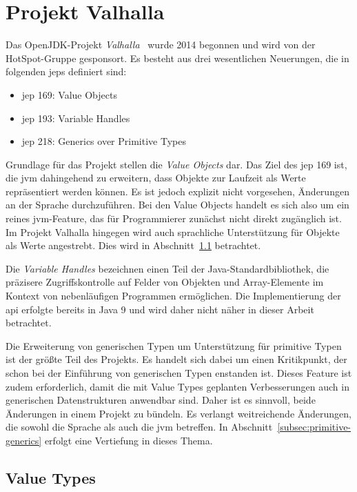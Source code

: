 \section{Projekt Valhalla}\label{sec:valhalla}

Das OpenJDK-Projekt \emph{Valhalla}~\cite{openjdk-valhalla} wurde 2014 begonnen und wird von der HotSpot-Gruppe gesponsort.
Es besteht aus drei wesentlichen Neuerungen, die in folgenden \acp{jep} definiert sind:

\begin{itemize}
    \itemsep0em
    \item \ac{jep} 169: Value Objects~\cite{jep-169}
    \item \ac{jep} 193: Variable Handles~\cite{jep-193}
    \item \ac{jep} 218: Generics over Primitive Types~\cite{jep-218}
\end{itemize}

Grundlage für das Projekt stellen die \emph{Value Objects} dar.
Das Ziel des \ac{jep} 169 ist, die \ac{jvm} dahingehend zu erweitern, dass Objekte zur Laufzeit als Werte repräsentiert werden können.
Es ist jedoch explizit nicht vorgesehen, Änderungen an der Sprache durchzuführen.
Bei den Value Objects handelt es sich also um ein reines \ac{jvm}-Feature, das für Programmierer zunächst nicht direkt zugänglich ist.
Im Projekt Valhalla hingegen wird auch sprachliche Unterstützung für Objekte als Werte angestrebt.
Dies wird in Abschnitt~\ref{subsec:value-types} betrachtet.

Die \emph{Variable Handles} bezeichnen einen Teil der Java-Standardbibliothek, die präzisere Zugriffskontrolle auf Felder von Objekten und Array-Elemente im Kontext von nebenläufigen Programmen ermöglichen.
Die Implementierung der \ac{api} erfolgte bereits in Java 9 und wird daher nicht näher in dieser Arbeit betrachtet.

Die Erweiterung von generischen Typen um Unterstützung für primitive Typen ist der größte Teil des Projekts.
Es handelt sich dabei um einen Kritikpunkt, der schon bei der Einführung von generischen Typen enstanden ist.
Dieses Feature ist zudem erforderlich, damit die mit Value Types geplanten Verbesserungen auch in generischen Datenstrukturen anwendbar sind.
Daher ist es sinnvoll, beide Änderungen in einem Projekt zu bündeln.
Es verlangt weitreichende Änderungen, die sowohl die Sprache als auch die \ac{jvm} betreffen.
In Abschnitt~\ref{subsec:primitive-generics} erfolgt eine Vertiefung in dieses Thema.

\subsection{Value Types}\label{subsec:value-types}


